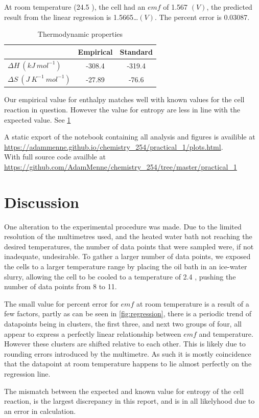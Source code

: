 \documentclass[a4paper, british]{article}
\begin{document}
At room temperature (24.5 \textcelsius{}), the cell had an \(emf\) of 1.567 \((V)\), the predicted result from the linear regression is 1.5665\ldots \((V)\). The percent error is 0.03087. 

\begin{table}[htb]
    \centering
    \caption{Thermodynamic properties}
    \begin{tabular}{lcc}
        \addlinespace
        \toprule
        & Empirical & Standard\\ 
        \midrule
        \(\Delta H\ (kJ\ mol^{-1})\) & -308.4 & -319.4\\
        \(\Delta S\ (J\ K^{-1}\ mol^{-1})\) & -27.89 & -76.6\\
        \bottomrule
        \end{tabular}
        \label{table:data}   
\end{table}

Our empirical value for enthalpy matches well with known values for the cell reaction in question. However the value for entropy are less in line with the expected value. See \cref{table:data}

A static export of the notebook containing all analysis and figures is availible at \url{https://adammenne.github.io/chemistry_254/practical_1/plots.html}.\\ With full source code availble at \url{https://github.com/AdamMenne/chemistry_254/tree/master/practical_1}

\section{Discussion}

One alteration to the experimental procedure was made. Due to the limited resolution of the multimetres used, and the heated water bath not reaching the desired temperatures, the number of data points that were sampled were, if not inadequate, undesirable. To gather a larger number of data points, we exposed the cells to a larger temperature range by placing the oil bath in an ice-water slurry, allowing the cell to be cooled to a temperature of 2.4 \textcelsius{}, pushing the number of data points from 8 to 11.

The small value for percent error for \(emf\) at room temperature is a result of a few factors, partly as can be seen in \cref{fig:regression}, there is a periodic trend of datapoints being in clusters, the first three, and next two groups of four, all appear to express a perfectly linear relationship between \(emf\) and temperature. However these clusters are shifted relative to each other. This is likely due to rounding errors introduced by the multimetre. As such it is mostly coincidence that the datapoint at room temperature happens to lie almost perfectly on the regression line.

The mismatch between the expected and known value for entropy of the cell reaction, is the largest discrepancy in this report, and is in all likelyhood due to an error in calculation.
\end{document}
